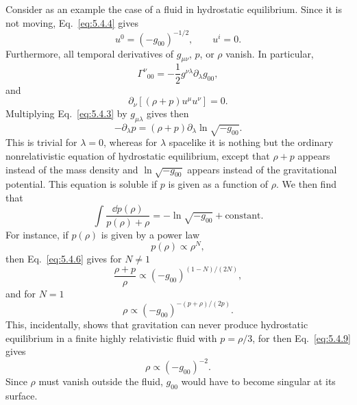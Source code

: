 Consider as an example the case of a fluid in hydrostatic equilibrium. Since
it is not moving, Eq.~\eqref{eq:5.4.4} gives
\[
  u^0=(-g_{00})^{-1/2},
  \qquad
  u^i=0.
\]
Furthermore, all temporal derivatives of \(g_{\mu\nu}\), \(p\), or \(\rho\)
vanish. In particular,
\[
  \Gamma^\nu{}_{00}
  =
  -\frac12 g^{\nu\lambda}\partial_\lambda g_{00},
\]
and
\[
  \partial_\nu
  \left[
    (\rho+p)u^\mu u^\nu
  \right]
  =0.
\]
Multiplying Eq.~\eqref{eq:5.4.3} by \(g_{\mu\lambda}\) gives then
\begin{equation}
  -\partial_\lambda p
  =
  (\rho+p)
  \partial_\lambda
  \ln\sqrt{-g_{00}}.
  \tag{5.4.5}\label{eq:5.4.5}
\end{equation}
This is trivial for \(\lambda=0\), whereas for \(\lambda\) spacelike it is
nothing but the ordinary nonrelativistic equation of hydrostatic
equilibrium, except that \(\rho+p\) appears instead of the mass density and
\(\ln\sqrt{-g_{00}}\) appears instead of the gravitational potential. This
equation is soluble if \(p\) is given as a function of \(\rho\). We then
find that
\begin{equation}
  \int
  \frac{\dd p(\rho)}{p(\rho)+\rho}
  =
  -\ln\sqrt{-g_{00}}
  +
  \text{constant}.
  \tag{5.4.6}\label{eq:5.4.6}
\end{equation}
For instance, if \(p(\rho)\) is given by a power law
\begin{equation}
  p(\rho)\propto\rho^N,
  \tag{5.4.7}\label{eq:5.4.7}
\end{equation}
then Eq.~\eqref{eq:5.4.6} gives for \(N\ne1\)
\begin{equation}
  \frac{\rho+p}{\rho}
  \propto
  (-g_{00})^{(1-N)/(2N)},
  \tag{5.4.8}\label{eq:5.4.8}
\end{equation}
and for \(N=1\)
\begin{equation}
  \rho
  \propto
  (-g_{00})^{-(p+\rho)/(2p)}.
  \tag{5.4.9}\label{eq:5.4.9}
\end{equation}
This, incidentally, shows that gravitation can never produce hydrostatic
equilibrium in a finite highly relativistic fluid with \(p=\rho/3\), for
then Eq.~\eqref{eq:5.4.9} gives
\begin{equation}
  \rho\propto(-g_{00})^{-2}.
  \tag{5.4.10}\label{eq:5.4.10}
\end{equation}
Since \(\rho\) must vanish outside the fluid, \(g_{00}\) would have to become
singular at its surface.
